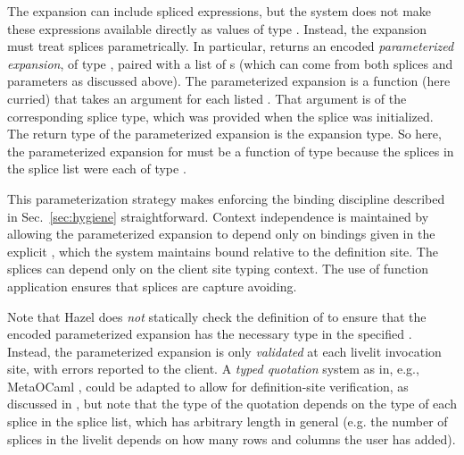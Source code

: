 The expansion can include spliced expressions, 
but the system does not make these expressions  
available directly as values of type . 
Instead, the expansion must treat splices parametrically. 
In particular,  returns an encoded \emph{parameterized expansion}, of type , 
paired with a list of s (which can come from 
both splices and parameters as discussed above).
The {parameterized expansion}
  is a function 
 (here curried)
 that takes an argument for each listed . 
 That argument is of the corresponding splice 
type, which was provided when the splice was initialized. 
 The return type of the parameterized expansion is the expansion type.
 So here, the parameterized expansion for  must be a function of type 
  because the splices 
 in the splice list were each of type .


This parameterization strategy makes enforcing the binding discipline described in Sec.~\ref{sec:hygiene}
straightforward. 
Context independence is maintained by allowing the parameterized expansion 
to depend only on bindings given in the explicit , which 
the system maintains bound relative to the definition site. 
The splices can 
depend only on the client site typing context. The use of function application ensures
that splices are capture avoiding. 

Note that Hazel does \emph{not} statically check the definition of 
to ensure that the encoded parameterized expansion has the necessary type in the specified . Instead, the parameterized expansion 
is only \emph{validated} at each livelit invocation site, with errors reported to the client. 
A \emph{typed quotation} system as in, e.g., MetaOCaml \cite{DBLP:conf/flops/Kiselyov14}, could be adapted to allow for definition-site verification, as discussed in \cite{TLMs}, but 
note that   
the type of the quotation depends on the type of each splice in 
the splice list, which has arbitrary length in general (e.g. the 
number of splices in the  livelit 
depends on how many rows and columns the user has added).
